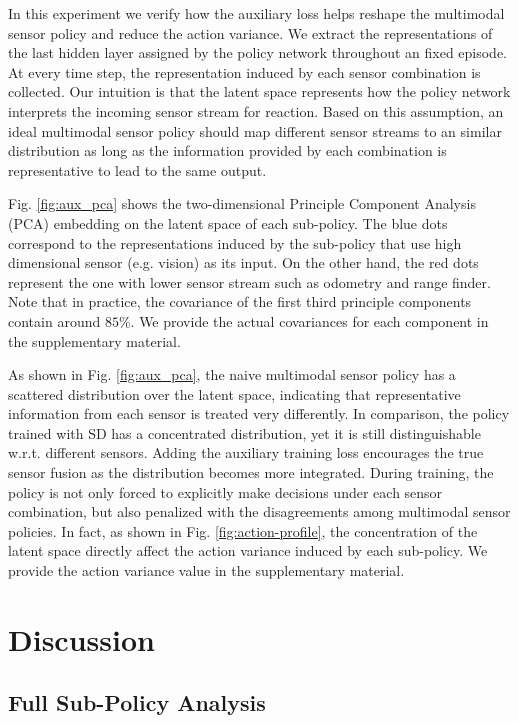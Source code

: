 \documentclass[../thesis.tex]{subfiles}
\begin{document}
In this experiment we verify how the auxiliary loss helps reshape the multimodal sensor policy and reduce the action variance. 
We extract the representations of the last hidden layer assigned by the policy network throughout an fixed episode. At every time step, the representation induced by each sensor combination is collected. 
Our intuition is that the latent space represents how the policy network interprets the incoming sensor stream for reaction. Based on this assumption, an ideal multimodal sensor policy should map different sensor streams to an similar distribution as long as the information provided by each combination is representative to lead to the same output.

Fig. \ref{fig:aux_pca} shows the two-dimensional Principle Component Analysis (PCA) embedding on the latent space of each sub-policy. The blue dots correspond to the representations induced by the sub-policy that use high dimensional sensor (e.g. vision) as its input. On the other hand, the red dots represent the one with lower sensor stream such as odometry and range finder. Note that in practice, the covariance of the first third principle components contain around $85\%$. We provide the actual covariances for each component in the supplementary material.

As shown in Fig. \ref{fig:aux_pca}, the naive multimodal sensor policy has a scattered distribution over the latent space, indicating that representative information from each sensor is treated very differently. In comparison, the policy trained with SD has a concentrated distribution, yet it is still distinguishable w.r.t. different sensors. Adding the auxiliary training loss encourages the true sensor fusion as the distribution becomes more integrated. During training, the policy is not only forced to explicitly make decisions under each sensor combination, but also penalized with the disagreements among multimodal sensor policies. In fact, as shown in Fig. \ref{fig:action-profile}, the concentration of the latent space directly affect the action variance induced by each sub-policy. We provide the action variance value in the supplementary material.


\section{Discussion} \label{sec:mdrl-discussion}


\subsection{Full Sub-Policy Analysis}
\label{SD-full-config}
\end{document}
